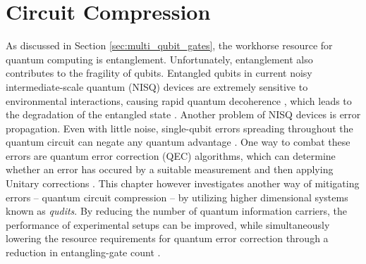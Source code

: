\chapter{Circuit Compression} \label{chap:compression}
As discussed in Section \ref{sec:multi_qubit_gates}, the workhorse resource for quantum computing is entanglement.
Unfortunately, entanglement also contributes to the fragility of qubits. Entangled qubits in current noisy intermediate-scale quantum (NISQ) devices \cite{Preskill_2018} are extremely sensitive to environmental interactions, causing rapid quantum decoherence \cite{SCHLOSSHAUER20191}, which leads to the degradation of the entangled state \cite{PhysRevLett.93.140404}.
Another problem of NISQ devices is error propagation. Even with little noise, single-qubit errors spreading throughout the quantum circuit can negate any quantum advantage \cite{PRXQuantum.3.040326}. One way to combat these errors are quantum error correction (QEC) algorithms, which can determine whether an error has occured by a suitable measurement and then applying Unitary corrections \cite{QuantumErrorCorrection}. This chapter however investigates another way of mitigating errors -- quantum circuit compression -- by utilizing higher dimensional systems known as \emph{qudits}. By reducing the number of quantum information carriers, the performance of experimental setups can be improved, while simultaneously lowering the resource requirements for quantum error correction through a reduction in entangling-gate count \cite{gao2023role}.
